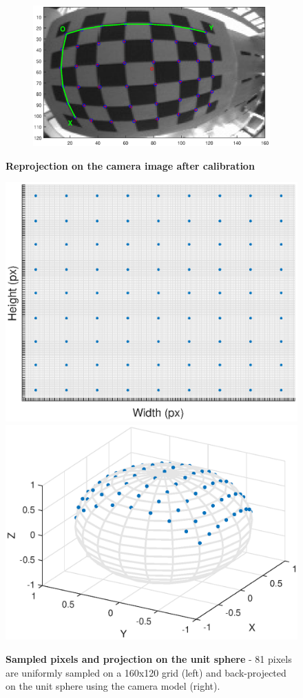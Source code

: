 \begin{figure}[h]
\begin{subfigure}[b]{0.4\textwidth}
    \end{subfigure}
	\begin{subfigure}[b]{0.4\textwidth}
        \centering
        \includegraphics[width=\textwidth]{images/camera/Reproj1.eps}
    \end{subfigure}
    \caption{\textbf{Reprojection on the camera image after calibration}}
    \label{fig:cameraReproj}
\end{figure}

\newpage

\begin{figure}[h]
\includegraphics[width=0.5\linewidth]{images/matlab/camPixels}
\includegraphics[width=0.5\linewidth]{images/matlab/sphericalMapping}
\caption{\textbf{Sampled pixels and projection on the unit sphere} - 81 pixels are uniformly sampled on a 160x120 grid (left) and back-projected on the unit sphere using the camera model (right).\label{fig:pixelMapping}}
\end{figure}

